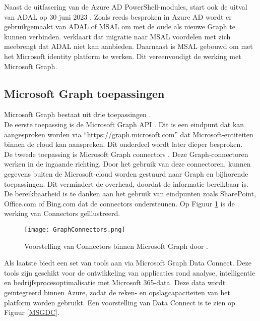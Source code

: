 
Naast de uitfasering van de Azure \ac{AD} PowerShell-modules, start ook de uitval van \ac{ADAL} op 30 juni 2023 \autocite{Sahay2022}. Zoals reeds besproken in Azure \ac{AD} wordt er gebruikgemaakt van \ac{ADAL} of \ac{MSAL} om met de oude als nieuwe Graph te kunnen verbinden. \textcite{Microsoft2023m} verklaart dat migratie naar \ac{MSAL} voordelen met zich meebrengt dat \ac{ADAL} niet kan aanbieden. Daarnaast is \ac{MSAL} gebouwd om met het Microsoft identity platform te werken. Dit vereenvoudigt de werking met Microsoft Graph.

\subsection{Microsoft Graph toepassingen}


Microsoft Graph bestaat uit drie toepassingen \autocite{Microsoft2023d}. \\

De eerste toepassing is de Microsoft Graph \Ac{API} \autocite{Microsoft2022e}. Dit is een eindpunt dat kan aangesproken worden via “https://graph.microsoft.com” dat Microsoft-entiteiten binnen de cloud kan aanspreken. Dit onderdeel wordt later dieper besproken. \\

De tweede toepassing is Microsoft Graph connectors \autocite{Microsoft2022f}. Deze Graph-connectoren werken in de ingaande richting. Door het gebruik van deze connectoren, kunnen gegevens buiten de Microsoft-cloud worden gestuurd naar Graph en bijhorende toepassingen. Dit vermindert de overhead, doordat de informatie bereikbaar is. De bereikbaarheid is te danken aan het gebruik van eindpunten zoals SharePoint, Office.com of Bing.com dat de connectors ondersteunen. Op Figuur \ref{MSGC} is de werking van Connectors geïllustreerd. \\

\begin{figure}[!h]
    \texttt{[image: GraphConnectors.png]}
    \caption[Voorbeeld Microsoft Graph Connectors]{Voorstelling van Connectors binnen Microsoft Graph door \textcite{Hay2021}.}
    \label{MSGC}
\end{figure}

Als laatste biedt \textcite{Microsoft2022c} een set van tools aan via Microsoft Graph Data Connect. Deze tools zijn geschikt voor de ontwikkeling van applicaties rond analyse, intelligentie en bedrijfsprocesoptimalisatie met Microsoft 365-data. Deze data wordt geïntegreerd binnen Azure, zodat de reken- en opslagcapaciteiten van het platform worden gebruikt. Een voorstelling van Data Connect is te zien op Figuur \ref{MSGDC}. 

